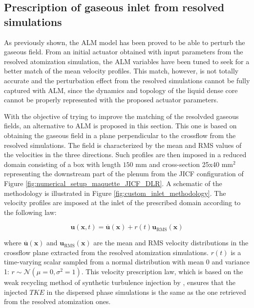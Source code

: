\subsection{Prescription of gaseous inlet from resolved simulations }
\label{subsec:ch6_jicf_lgs_gaseous_inlet_prescription}





As previously shown, the ALM model has been proved to be able to perturb the gaseous field. From an initial actuator obtained with input parameters from the resolved atomization simulation, the ALM variables have been tuned to seek for a better match of the mean velocity profiles. This match, however, is not totally accurate and the perturbation effect from the resolved simulations cannot be fully captured with ALM, since the dynamics and topology of the liquid dense core cannot be properly represented with the proposed actuator parameters. 

With the objective of trying to improve the matching of the resolvded gaseous fields, an alternative to ALM is proposed in this section. This one is based on obtaining the gaseous field in a plane perpendicular to the crossflow from the resolved simulations. The field is characterized by the mean and RMS values of the velocities in the three directions. Such profiles are then imposed in a reduced domain consisting of a box with length $150$ mm and cross-section 25x40 mm$^2$ representing the downstream part of the plenum from the JICF configuration of Figure \ref{fig:numerical_setup_maquette_JICF_DLR}. A schematic of the methodology is illustrated in Figure \ref{fig:custom_inlet_methodology}. The velocity profiles are imposed at the inlet of the prescribed domain according to the following law:

\begin{equation}
\label{eq:prescribed_inlet_u_gas_injection_law}
\textbf{u} \left( \textbf{x}, t \right) = \overline{\textbf{u}} \left( \textbf{x} \right)  + r \left( t \right)  \textbf{u}_\mathrm{RMS} \left( \textbf{x} \right) 
\end{equation}

where $\overline{\textbf{u}} \left( \textbf{x} \right)$ and $\textbf{u}_\mathrm{RMS} \left( \textbf{x} \right)$ are the mean and RMS velocity distributions in the crossflow plane extracted from the resolved atomization simulations. $r \left( t \right)$ is a time-varying scalar sampled from a normal distribution with mean 0 and variance 1: $r \sim \mathcal{N} \left( \mu = 0, \sigma^2 = 1 \right)$. This velocity prescription law, which is based on the weak recycling method of synthetic turbulence injection by \citeColor[wu_large_1995], ensures that the injected $TKE$ in the dispersed phase simulations is the same as the one retrieved from the resolved atomization ones. %

